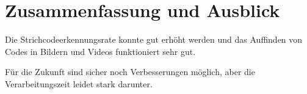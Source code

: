 \chapter{Zusammenfassung und Ausblick}

Die Strichcodeerkennungsrate konnte gut erhöht werden und das Auffinden von Codes in Bildern und Videos funktioniert sehr gut.

Für die Zukunft sind sicher noch Verbesserungen möglich, aber die Verarbeitungszeit leidet stark darunter.